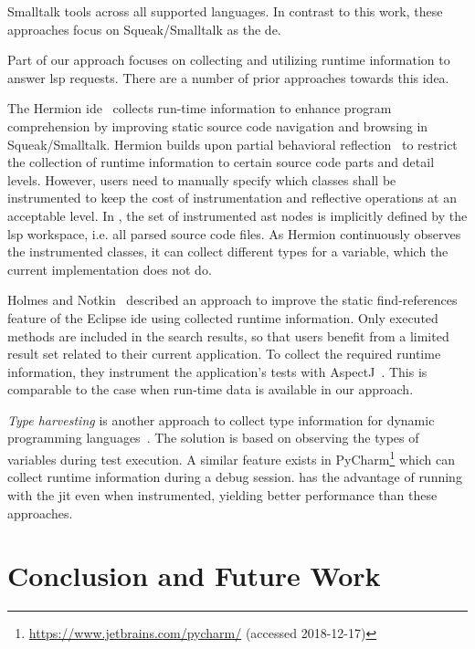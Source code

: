 \documentclass[sigplan,10pt,screen]{acmart}
\begin{document}
{Smalltalk tools across all supported languages. In contrast to
this work, these approaches focus on Squeak/Smalltalk as the \ac{de}.

Part of our approach focuses on collecting and utilizing runtime information to
answer \ac{lsp} requests. There are a number of prior approaches towards this
idea.

The Hermion \acs{ide}~\cite{rothlisberger2008exploiting} collects run-time
information to enhance program comprehension by improving static source code
navigation and browsing in Squeak/Smalltalk. Hermion builds upon partial
behavioral reflection~\cite{tanter2003partial} to restrict the collection of
runtime information to certain source code parts and detail levels. However,
users need to manually specify which classes shall be instrumented to keep the
cost of instrumentation and reflective operations at an acceptable level. In
\graallsp, the set of instrumented \ac{ast} nodes is implicitly defined by the
\ac{lsp} workspace, i.e. all parsed source code files. As Hermion continuously
observes the instrumented classes, it can collect different types for a
variable, which the current \graallsp implementation does not do.
    
Holmes and Notkin~\cite{holmes2010enhancing} described an approach to improve
the static find-references feature of the Eclipse \acs{ide} using collected
runtime information. Only executed methods are included in the search results,
so that users benefit from a limited result set related to their current
application. To collect the required runtime information, they instrument the
application's tests with AspectJ~\cite{kiczales2001overview}. This is comparable
to the case when run-time data is available in our approach.

\emph{Type harvesting} is another approach to collect type information for
dynamic programming languages~\cite{haupt2011type}. The solution is based on
observing the types of variables during test execution. A similar feature exists
in PyCharm\footnote{\url{https://www.jetbrains.com/pycharm/} (accessed 2018-12-17)}
which can collect runtime information during a debug
session. \graallsp has the advantage of running with the \ac{jit} even when
instrumented, yielding better performance than these approaches.

\section{Conclusion and Future Work}
\label{cha:conclusion}

}
\end{document}
